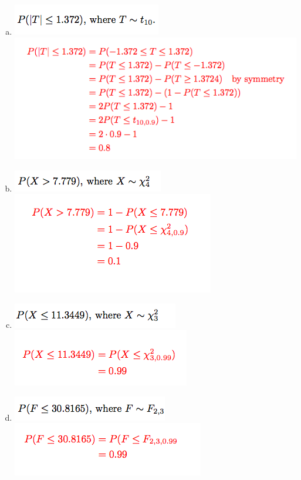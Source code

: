\documentclass{article}\usepackage{graphicx, color}
\numberwithin{equation}{section}
\begin{document}
\begin{flushleft}
\begin{enumerate}[1. ]
\begin{enumerate}[a. ]
\item 
{} \includegraphics{../../fig/h6p4d.png}
 \includegraphics{../../fig/h6p4dsol.png}

\item 
{} \includegraphics{../../fig/h6p4e.png}
 \includegraphics{../../fig/h6p4esol.png}

\item 
{} \includegraphics{../../fig/h6p4f.png}
 \includegraphics{../../fig/h6p4fsol.png}

\item 
{} \includegraphics{../../fig/h6p4g.png}
 \includegraphics{../../fig/h6p4gsol.png}


\end{enumerate}
\end{enumerate}
\end{flushleft}
\end{document}
